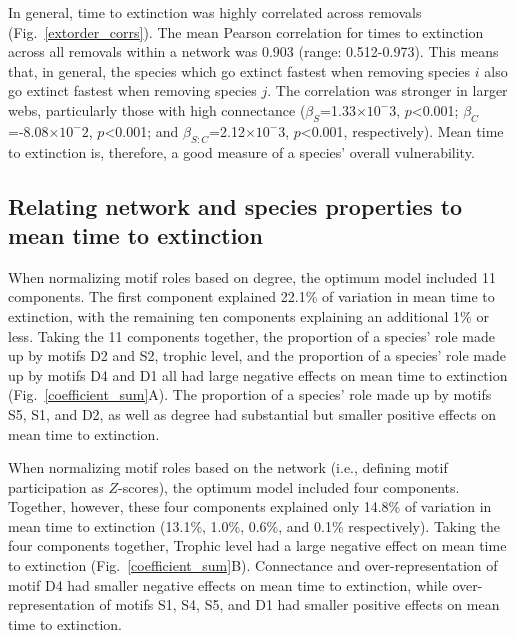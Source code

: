\documentclass[12pt]{article}
\begin{document}
		In general, time to extinction was highly correlated across removals (Fig.~\ref{extorder_corrs}). %
		The mean Pearson correlation for times to extinction across all removals within a network was 0.903 (range: 0.512-0.973). %
		This means that, in general, the species which go extinct fastest when removing species $i$ also go extinct fastest when removing species $j$.
		The correlation was stronger in larger webs, particularly those with high connectance ($\beta_{S}$=1.33$\times10^-3$, $p$\textless0.001; $\beta_{C}$=-8.08$\times10^-2$, $p$\textless0.001; and $\beta_{S:C}$=2.12$\times10^-3$, $p$\textless0.001, respectively). 
		Mean time to extinction is, therefore, a good measure of a species' overall vulnerability.


	\subsection*{Relating network and species properties to mean time to extinction}

		When normalizing motif roles based on degree, the optimum model included 11 components.
		The first component explained 22.1\% of variation in mean time to extinction, with the remaining ten components explaining an additional 1\% or less.
		Taking the 11 components together, the proportion of a species' role made up by motifs D2 and S2, trophic level, and the proportion of a species' role made up by motifs D4 and D1 all had large negative effects on mean time to extinction (Fig.~\ref{coefficient_sum}A).
		The proportion of a species' role made up by motifs S5, S1, and D2, as well as degree had substantial but smaller positive effects on mean time to extinction.


		When normalizing motif roles based on the network (i.e., defining motif participation as $Z$-scores), the optimum model included four components.
		Together, however, these four components explained only 14.8\% of variation in mean time to extinction (13.1\%, 1.0\%, 0.6\%, and 0.1\% respectively).
		Taking the four components together, Trophic level had a large negative effect on mean time to extinction (Fig.~\ref{coefficient_sum}B).
		Connectance and over-representation of motif D4 had smaller negative effects on mean time to extinction, while over-representation of motifs S1, S4, S5, and D1 had smaller positive effects on mean time to extinction.
\end{document}
